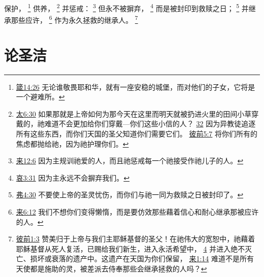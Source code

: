 \documentclass[12pt, a4paper, oneside]{ctexart}
\begin{document}
	保护，
	\footnote {
		\href{https://biblehub.com/proverbs/14-26.htm}{箴14:26} 无论谁敬畏耶和华，就有一座安稳的城堡，而对他们的子女，它将是一个避难所。
	}
	供养，
	\footnote {
		\href{https://biblehub.com/matthew/6-30.htm}{太6:30} 如果那就是上帝如何为那今天在这里而明天就被扔进火里的田间小草穿戴的，祂难道不会更加给你们穿戴---你们这些小信的人？
		\href{https://biblehub.com/matthew/6-32.htm}{32} 因为异教徒追逐所有这些东西，而你们天国的圣父知道你们需要它们。
		\href{https://biblehub.com/1_peter/5-7.htm}{彼前5:7} 将你们所有的焦虑都抛给祂，因为祂护理你们。
	}
	并惩戒：
	\footnote {
		\href{https://biblehub.com/hebrews/12-6.htm}{来12:6} 因为主规训祂爱的人，而且祂惩戒每一个祂接受作祂儿子的人。
	}
	但永不被摒弃，
	\footnote {
		\href{https://biblehub.com/lamentations/3-31.htm}{哀3:31} 因为主永远不会摒弃我们。
	}
	而是被封印到救赎之日；
	\footnote {
		\href{https://biblehub.com/ephesians/4-30.htm}{弗4:30} 不要使上帝的圣灵忧伤，而你们与祂一同为救赎之日被封印了。
	}
	并继承那些应许，
	\footnote {
		\href{https://biblehub.com/hebrews/6-12.htm}{来6:12} 我们不想你们变得懒惰，而是要仿效那些藉着信心和耐心继承那被应许的人。
	}
	作为永久拯救的继承人。
	\footnote {
		\href{https://biblehub.com/1_peter/1-3.htm}{彼前1:3} 赞美归于上帝与我们主耶稣基督的圣父！在祂伟大的宽恕中，祂藉着耶稣基督从死人复活，已赐给我们新生，进入永活希望中，
		\href{https://biblehub.com/1_peter/1-4.htm}{4} 并进入绝不灭亡、损坏或衰落的遗产中。这遗产在天国为你们保留，
		\href{https://biblehub.com/hebrews/1-14.htm}{来1:14} 难道不是所有天使都是施助的灵，被差派去侍奉那些会继承拯救的人吗？
	}

\section{论圣洁}
\end{document}
